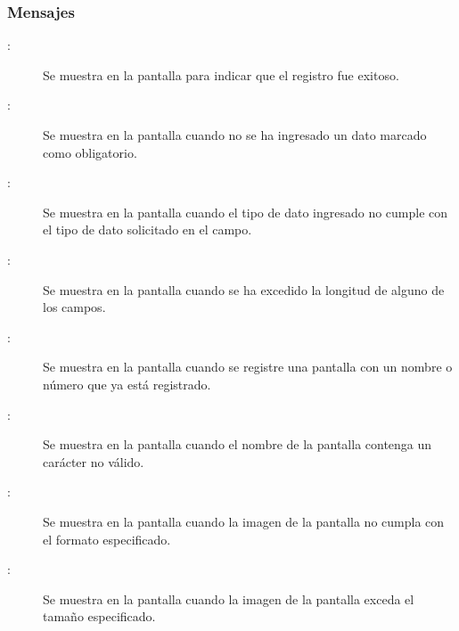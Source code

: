 \subsubsection{Mensajes}
	
\begin{description}
	\item[:] Se muestra en la pantalla  para indicar que el registro fue exitoso.
	\item[:] Se muestra en la pantalla  cuando no se ha ingresado un dato marcado como obligatorio.
	\item[:] Se muestra en la pantalla  cuando el tipo de dato ingresado no cumple con el tipo de dato solicitado en el campo.
	\item[:] Se muestra en la pantalla  cuando se ha excedido la longitud de alguno de los campos.
	\item[:] Se muestra en la pantalla  cuando se registre una pantalla con un nombre o número que ya está registrado.
	\item[:] Se muestra en la pantalla  cuando el nombre de la pantalla contenga un carácter no válido.
	\item[:] Se muestra en la pantalla  cuando la imagen de la pantalla no cumpla con el formato especificado.
	\item[:] Se muestra en la pantalla  cuando la imagen de la pantalla exceda el tamaño especificado.
\end{description}
